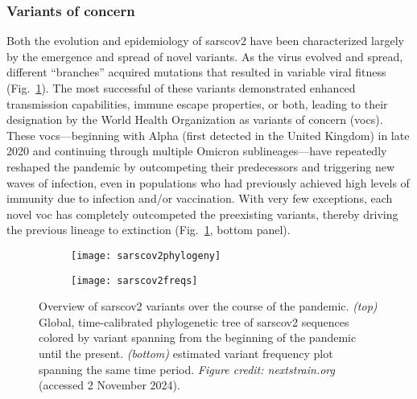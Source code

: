 \subsubsection{Variants of concern}
Both the evolution and epidemiology of \gls{sarscov2} have been characterized largely by the emergence and spread of novel variants.
As the virus evolved and spread, different ``branches'' acquired mutations that resulted in variable viral fitness (Fig.~\ref{fig:sarscov2phylo}).
The most successful of these variants demonstrated enhanced transmission capabilities, immune escape properties, or both, leading to their designation by the World Health Organization as variants of concern (\gls{voc}s).
These \gls{voc}s---beginning with Alpha (first detected in the United Kingdom) in late 2020 and continuing through multiple Omicron sublineages---have repeatedly reshaped the pandemic by outcompeting their predecessors and triggering new waves of infection, even in populations who had previously achieved high levels of immunity due to infection and/or vaccination.
With very few exceptions, each novel \gls{voc} has completely outcompeted the preexisting variants, thereby driving the previous lineage to extinction (Fig.~\ref{fig:sarscov2phylo}, bottom panel).

\begin{figure}[ht]
  \centering
  \begin{subfigure}{0.9\textwidth}
    \texttt{[image: sarscov2phylogeny]}
  \end{subfigure}
  \begin{subfigure}{0.9\textwidth}
    \texttt{[image: sarscov2freqs]}
  \end{subfigure}
  \caption[SARS-CoV-2 phylogeny and variant frequencies]{Overview of \gls{sarscov2} variants over the course of the pandemic. \textit{(top)} Global, time-calibrated phylogenetic tree of \gls{sarscov2} sequences colored by variant spanning from the beginning of the pandemic until the present. \textit{(bottom)} estimated variant frequency plot spanning the same time period. \textit{Figure credit: nextstrain.org} \citep{hadfield2018nextstrain} (accessed 2 November 2024).}
  \label{fig:sarscov2phylo}
\end{figure}

